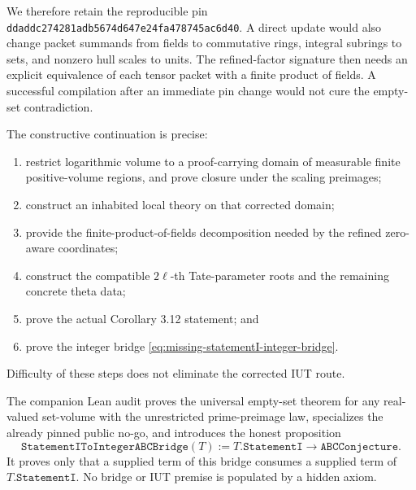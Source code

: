 We therefore retain the reproducible pin
\texttt{ddaddc274281adb5674d647e24fa478745ac6d40}.  A direct update would
also change packet summands from fields to commutative rings, integral
subrings to sets, and nonzero hull scales to units.  The refined-factor
signature then needs an explicit equivalence of each tensor packet with a
finite product of fields.  A successful compilation after an immediate pin
change would not cure the empty-set contradiction.

The constructive continuation is precise:
\begin{enumerate}
\item restrict logarithmic volume to a proof-carrying domain of measurable
finite positive-volume regions, and prove closure under the scaling
preimages;
\item construct an inhabited local theory on that corrected domain;
\item provide the finite-product-of-fields decomposition needed by the
refined zero-aware coordinates;
\item construct the compatible $2\ell$-th Tate-parameter roots and the
remaining concrete theta data;
\item prove the actual Corollary 3.12 statement; and
\item prove the integer bridge \eqref{eq:missing-statementI-integer-bridge}.
\end{enumerate}
Difficulty of these steps does not eliminate the corrected IUT route.

The companion Lean audit proves the universal empty-set theorem for any
real-valued set-volume with the unrestricted prime-preimage law, specializes
the already pinned public no-go, and introduces the honest proposition
\[
 \texttt{StatementIToIntegerABCBridge}(T):=
 T.\texttt{StatementI}\to\texttt{ABCConjecture}.
\]
It proves only that a supplied term of this bridge consumes a supplied term
of $T.\texttt{StatementI}$.  No bridge or IUT premise is populated by a
hidden axiom.
